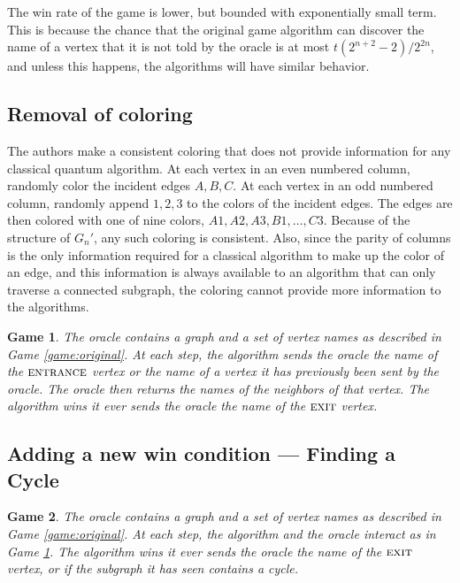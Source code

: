 \documentclass[aps,11pt,twoside,nofootinbib,tightenlines,superscriptaddress,preprintnumbers]{revtex4}
\newcommand{\<}{\langle}
\renewcommand{\>}{\rangle}
\newcommand{\ent}{{\textsc{entrance}}}
\newcommand{\exit}{{\textsc{exit}}}
\newtheorem{game}{Game}
\newenvironment{proof sketch}
{\trivlist\item\noindent{\bf Proof sketch}~}
{\qed\endtrivlist}
\begin{document}
The win rate of the game is lower, but bounded with exponentially small term. This is because the chance that the original game algorithm can discover the name of a vertex that it is not told by the oracle is at most $t (2^{n+2}-2) / 2^{2n}$, and unless this happens, the algorithms will have similar behavior.

\subsection{Removal of coloring}

The authors make a consistent coloring that does not provide information for any classical quantum algorithm. At each vertex in an even numbered column, randomly color the incident edges $A,B,C$.  At each vertex in an odd numbered column, randomly append $1,2,3$ to the colors of the incident edges.  The edges are then colored with one of nine colors, $A1,A2,A3,B1,\ldots,C3$.  Because of the structure of $G_n'$, any such coloring is consistent. Also, since the parity of columns is the only information required for a classical algorithm to make up the color of an edge, and this information is always available to an algorithm that can only traverse a connected subgraph, the coloring cannot provide more information to the algorithms.

\begin{game}\label{game:nocolors}
  The oracle contains a graph and a set of vertex names as described in
  Game \ref{game:original}.
%
  At each step, the algorithm sends the oracle the name of the $\ent$
  vertex or the name of a vertex it has previously been sent by the
  oracle.  The oracle then returns the names of the neighbors of that
  vertex.
%
  The algorithm wins it ever sends the oracle the name of the $\exit$
  vertex.
\end{game}

\subsection{Adding a new win condition ---  Finding a Cycle}

\begin{game}\label{game:nocycles}
  The oracle contains a graph and a set of vertex names as described in
  Game \ref{game:original}.
%
  At each step, the algorithm and the oracle interact as in Game
  \ref{game:nocolors}.
%
  The algorithm wins it ever sends the oracle the name of the $\exit$
  vertex, or if the subgraph it has seen contains a cycle.
\end{game}
\end{document}
